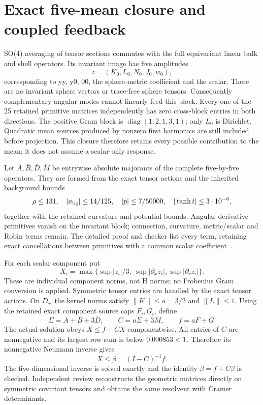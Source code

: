 \documentclass[11pt]{article}
\begin{document}
\section{Exact five-mean closure and coupled feedback}
SO(4) averaging of tensor sections commutes with the full equivariant
linear bulk and shell operators. Its invariant image has five amplitudes
\[
z=(K_0,L_0,N_0,J_0,w_0),
\]
corresponding to yy, y0, 00, the sphere-metric coefficient and the scalar.
There are no invariant sphere vectors or trace-free sphere tensors.
Consequently complementary angular modes cannot linearly feed this block.
Every one of the 25 retained primitive matrices independently has zero
cross-block entries in both directions. The positive Gram block is
$\operatorname{diag}(1,2,1,3,1)$; only $L_0$ is Dirichlet.
Quadratic mean sources produced by nonzero first harmonics are still
included before projection. This closure therefore retains every possible
contribution to the mean; it does not assume a scalar-only response.

Let $\overline A,\overline B,\overline D,\overline M$ be entrywise absolute
majorants of the complete five-by-five operators. They are formed from the
exact tensor actions and the inherited background bounds
\[
\rho\le131,\quad |a_{\rm bg}|\le14/125,\quad |p|\le7/50000,
\quad |\tanh t|\le3\cdot10^{-6},
\]
together with the retained curvature and potential bounds.
Angular derivative primitives vanish on the invariant block; connection,
curvature, metric/scalar and Robin terms remain. The detailed proof and
checker list every term, retaining exact cancellations between primitives
with a common scalar coefficient~\cite{meanproof}.

For each scalar component put
\[
X_i=\max\{\sup|z_i|/3,\ \sup|\partial_xz_i|,
                         \sup|\partial_rz_i|\}.
\]
These are individual component norms, not H norms; no Frobenius Gram
conversion is applied. Symmetric tensor entries are handled by the exact
tensor actions. On $D_+$ the kernel norms satisfy $\|K\|\le a=3/2$ and
$\|L\|\le1$. Using the retained exact component source caps $F_i,G_i$,
define
\[
\Sigma=\overline A+\overline B+3\overline D,\qquad
C=a\Sigma+3\overline M,\qquad f=aF+G.
\]
The actual solution obeys $X\le f+CX$ componentwise. All entries of $C$
are nonnegative and its largest row sum is below $0.000853<1$.
Therefore its nonnegative Neumann inverse gives
\[
X\le\beta=(I-C)^{-1}f.
\]
The five-dimensional inverse is solved exactly and the identity
$\beta=f+C\beta$ is checked. Independent review reconstructs the geometric
matrices directly on symmetric covariant tensors and obtains the same
resolvent with Cramer determinants.
\end{document}
